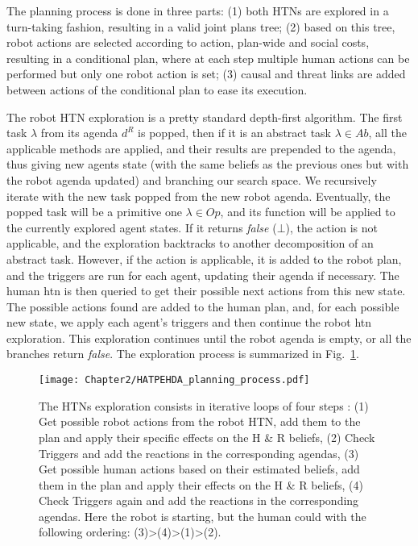 The planning process is done in three parts: (1) both HTNs are explored in a turn-taking fashion, resulting in a valid joint plans tree; (2) based on this tree, robot actions are selected according to action, plan-wide and social costs, resulting in a conditional plan, where at each step multiple human actions can be performed but only one robot action is set; (3) causal and threat links are added between actions of the conditional plan to ease its execution.

The robot HTN exploration is a pretty standard depth-first algorithm. The first task $\lambda$ from its agenda $d^R$ is popped, then if it is an abstract task $\lambda \in Ab$, all the applicable methods are applied, and their results are prepended to the agenda, thus giving new agents state (with the same beliefs as the previous ones but with the robot agenda updated) and branching our search space. We recursively iterate with the new task popped from the new robot agenda. Eventually, the popped task will be a primitive one $\lambda \in Op$, and its function will be applied to the currently explored agent states. If it returns \textit{false} ($\bot$), the action is not applicable, and the exploration backtracks to another decomposition of an abstract task. However, if the action is applicable, it is added to the robot plan, and the triggers are run for each agent, updating their agenda if necessary. The human \acrshort{htn} is then queried to get their possible next actions from this new state. The possible actions found are added to the human plan, and, for each possible new state, we apply each agent's triggers and then continue the robot \acrshort{htn} exploration. This exploration continues until the robot agenda is empty, or all the branches return \textit{false}. The exploration process is summarized in Fig.~\ref{fig:HATPEHDA_planning_process}.

\begin{figure}
    \centering
    \texttt{[image: Chapter2/HATPEHDA\_planning\_process.pdf]}
    \caption{The HTNs exploration consists in iterative loops of four steps : (1) Get possible robot actions from the robot HTN, add them to the plan and apply their specific effects on the H \& R beliefs, (2) Check Triggers and add the reactions in the corresponding agendas, (3) Get possible human actions based on their estimated beliefs, add them in the plan and apply their effects on the H \& R  beliefs, (4) Check Triggers again and add the reactions in the corresponding agendas. Here the robot is starting, but the human could with the following ordering: (3)>(4)>(1)>(2).}
    \label{fig:HATPEHDA_planning_process}
\end{figure}

